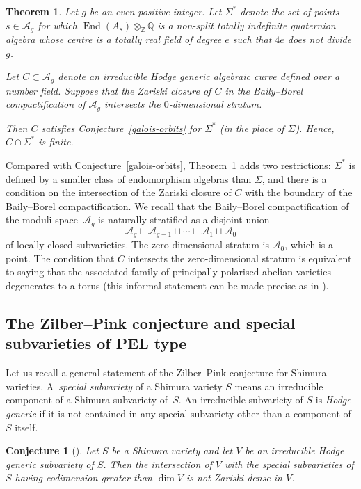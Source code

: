 \documentclass[11pt]{article}
\numberwithin{equation}{section}
\newcommand{\bQ}{\mathbb{Q}}
\newcommand{\bZ}{\mathbb{Z}}
\newcommand{\cA}{\mathcal{A}}
\newcommand{\Ag}{\mathcal{A}_g}
\DeclareMathOperator{\End}{End}
\newcommand{\defterm}[1]{\emph{#1}}
\newtheorem{theorem}[lemma]{Theorem}
\newtheorem{conjecture}[lemma]{Conjecture}
\begin{document}
\begin{theorem}\label{unconditional}
Let $g$ be an even positive integer.
Let $\Sigma^*$ denote the set of points $s \in \Ag$ for which $\End(A_s) \otimes_\bZ \bQ$ is a non-split totally indefinite quaternion algebra whose centre is a totally real field of degree $e$ such that $4e$ does not divide $g$.

Let $C\subset\cA_g$ denote an irreducible Hodge generic algebraic curve defined over a number field. Suppose that the Zariski closure of $C$ in the Baily--Borel compactification of $\Ag$ intersects the $0$-dimensional stratum.

Then $C$ satisfies Conjecture~\ref{galois-orbits} for $\Sigma^*$ (in the place of $\Sigma$). Hence, $C \cap \Sigma^*$ is finite.
\end{theorem}

Compared with Conjecture~\ref{galois-orbits}, Theorem~\ref{unconditional} adds two restrictions: $\Sigma^*$ is defined by a smaller class of endomorphism algebras than $\Sigma$, and there is a condition on the intersection of the Zariski closure of $C$ with the boundary of the Baily--Borel compactification.
We recall that the Baily--Borel compactification of the moduli space~$\cA_g$ is naturally stratified as a disjoint union
\[\cA_g\sqcup\cA_{g-1}\sqcup\cdots\sqcup\cA_1\sqcup\cA_0\]
of locally closed subvarieties.
The zero-dimensional stratum is $\cA_0$, which is a point.
The condition that $C$ intersects the zero-dimensional stratum is equivalent to saying that the associated family of principally polarised abelian varieties degenerates to a torus (this informal statement can be made precise as in \cite[Th.\,1.4]{ExCM}).

\subsection{The Zilber--Pink conjecture and special subvarieties of PEL type} \label{subsec:intro-zp-context}

Let us recall a general statement of the Zilber--Pink conjecture for Shimura varieties. A~\defterm{special subvariety} of a Shimura variety $S$ means an irreducible component of a Shimura subvariety of~$S$.
An irreducible subvariety of $S$ is \defterm{Hodge generic} if it is not contained in any special subvariety other than a component of $S$ itself.

\begin{conjecture}[{\cite[Conj.\,1.3]{pink:generalisation}}] \label{zilber-pink}
Let $S$ be a Shimura variety and let $V$ be an irreducible Hodge generic subvariety of $S$.
Then the intersection of $V$ with the special subvarieties of $S$ having codimension greater than $\dim V$ is not Zariski dense in $V$.
\end{conjecture}
\end{document}
